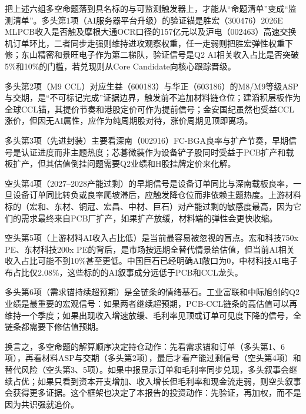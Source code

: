 把上述六组多空命题落到具名标的与可监测触发器上，才能从``命题清单''变成``监测清单''。多头第1项（AI服务器平台升级）的验证锚是胜宏（300476）2026E MLPCB收入是否触及摩根大通OCR口径的157亿元以及沪电（002463）高速交换机订单环比，二者同步走强则维持进攻观察权重，任一走弱则把胜宏弹性权重下修；东山精密和景旺电子作为第二梯队，验证信号是Q2 AI相关收入占比是否突破5\%和10\%的门槛，若兑现则从Core Candidate向核心跟踪晋级。

多头第2项（M9 CCL）对应生益（600183）与华正（603186）的M8/M9等级ASP与交期，是``不可标记完成''证据边界，触发前不追加材料链仓位；建滔积层板作为全球CCL锚，其提价节奏和港股定价可作为提前信号；金安国纪虽然也受益CCL涨价，但因无AI属性，应作为纯周期股对待，涨价周期见顶即离场。

多头第3项（先进封装）主要看深南（002916）FC-BGA良率与扩产节奏，早期信号是认证进度而非主题热度；芯碁微装作为设备铲子股同时受益于PCB扩产和载板扩产，但其估值倒挂问题需要Q2业绩和H股挂牌定价来化解。

空头第4项（2027--2028产能过剩）的早期信号是设备订单同比与深南载板良率，一旦设备订单同比转负或良率爬坡滞后，应触发降仓位而非依赖主题热度。上游材料标的（宏和、东材、铜冠、宏昌、中材、巨石）对产能过剩的敏感度最高，因为它们的需求最终来自PCB厂扩产，如果扩产放缓，材料端的弹性会更快收缩。

空头第5项（上游材料AI收入占比低）是当前最容易被忽视的盲点。宏和科技750x PE、东材科技200x PE的背后，是市场按远期全替代情景给估值，但当前AI相关收入占比可能不到10\%甚至更低。中国巨石已经明确AI敞口为0，中材科技AI电子布占比仅2.08\%，这些标的的AI叙事成分远低于PCB和CCL龙头。

多头第6项（需求锚持续超预期）是全链条的情绪基石。工业富联和中际旭创的Q2业绩是最重要的宏观信号：如果两者继续超预期，PCB-CCL链条的高估值可以再维持一个季度；如果出现收入增速放缓、毛利率见顶或订单可见度下降的信号，全链条都需要下修估值预期。

换言之，多空命题的解算顺序决定持仓动作：先看需求锚和订单（多头第1、6项），再看材料ASP与交期（多头第2项），最后才看产能过剩信号（空头第4项）和替代风险（空头第3、5项）。如果中报显示订单和毛利率同步兑现，多头叙事会继续占优；如果只看到资本开支增加、收入增长但毛利率和现金流走弱，则空头叙事会获得更多证据。这个框架也决定了本报告的投资动作：先验证，再加权，而不是因为共识强就追价。
